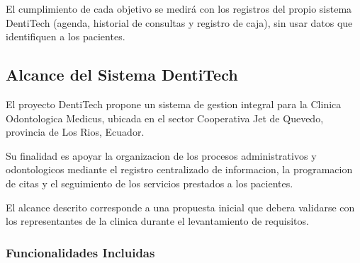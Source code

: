 \documentclass[12pt,a4paper]{article}
\begin{document}
El cumplimiento de cada objetivo se medir{\'a} con los registros del propio sistema DentiTech (agenda, historial de consultas y registro de caja), sin usar datos que identifiquen a los pacientes.



\subsection{Alcance del Sistema DentiTech}

El proyecto DentiTech propone un sistema de gestion
integral para la Clinica Odontologica Medicus,
ubicada en el sector Cooperativa Jet de Quevedo,
provincia de Los Rios, Ecuador.

Su finalidad es apoyar la organizacion de los
procesos administrativos y odontologicos mediante
el registro centralizado de informacion, la
programacion de citas y el seguimiento de los
servicios prestados a los pacientes.

El alcance descrito corresponde a una propuesta
inicial que debera validarse con los representantes
de la clinica durante el levantamiento de requisitos.

\subsubsection{Funcionalidades Incluidas}
\end{document}
